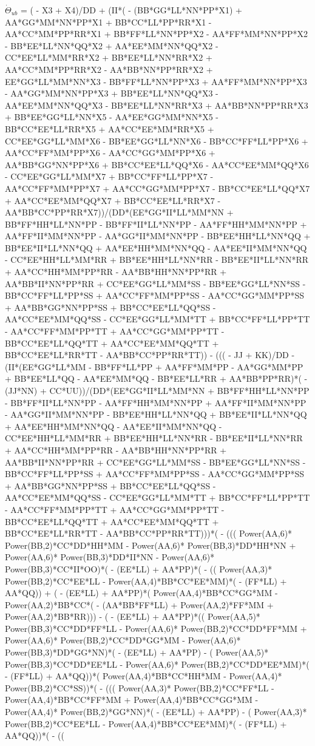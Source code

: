 \documentclass[10pt]{article} %
\begin{document}
$\dot{\Theta}_{ub}$ =
{\tiny
  ( - X3 + X4)/DD + (II*( - (BB*GG*LL*NN*PP*X1) + AA*GG*MM*NN*PP*X1 + BB*CC*LL*PP*RR*X1 - AA*CC*MM*PP*RR*X1 + BB*FF*LL*NN*PP*X2 - AA*FF*MM*NN*PP*X2 - BB*EE*LL*NN*QQ*X2 + AA*EE*MM*NN*QQ*X2 - CC*EE*LL*MM*RR*X2 + BB*EE*LL*NN*RR*X2 + AA*CC*MM*PP*RR*X2 - AA*BB*NN*PP*RR*X2 + EE*GG*LL*MM*NN*X3 - BB*FF*LL*NN*PP*X3 + AA*FF*MM*NN*PP*X3 - AA*GG*MM*NN*PP*X3 + BB*EE*LL*NN*QQ*X3 - AA*EE*MM*NN*QQ*X3 - BB*EE*LL*NN*RR*X3 + AA*BB*NN*PP*RR*X3 + BB*EE*GG*LL*NN*X5 - AA*EE*GG*MM*NN*X5 - BB*CC*EE*LL*RR*X5 + AA*CC*EE*MM*RR*X5 + CC*EE*GG*LL*MM*X6 - BB*EE*GG*LL*NN*X6 - BB*CC*FF*LL*PP*X6 + AA*CC*FF*MM*PP*X6 - AA*CC*GG*MM*PP*X6 + AA*BB*GG*NN*PP*X6 + BB*CC*EE*LL*QQ*X6 - AA*CC*EE*MM*QQ*X6 - CC*EE*GG*LL*MM*X7 + BB*CC*FF*LL*PP*X7 - AA*CC*FF*MM*PP*X7 + AA*CC*GG*MM*PP*X7 - BB*CC*EE*LL*QQ*X7 + AA*CC*EE*MM*QQ*X7 + BB*CC*EE*LL*RR*X7 - AA*BB*CC*PP*RR*X7))/(DD*(EE*GG*II*LL*MM*NN + BB*FF*HH*LL*NN*PP - BB*FF*II*LL*NN*PP - AA*FF*HH*MM*NN*PP + AA*FF*II*MM*NN*PP - AA*GG*II*MM*NN*PP - BB*EE*HH*LL*NN*QQ + BB*EE*II*LL*NN*QQ + AA*EE*HH*MM*NN*QQ - AA*EE*II*MM*NN*QQ - CC*EE*HH*LL*MM*RR + BB*EE*HH*LL*NN*RR - BB*EE*II*LL*NN*RR + AA*CC*HH*MM*PP*RR - AA*BB*HH*NN*PP*RR + AA*BB*II*NN*PP*RR + CC*EE*GG*LL*MM*SS - BB*EE*GG*LL*NN*SS - BB*CC*FF*LL*PP*SS + AA*CC*FF*MM*PP*SS - AA*CC*GG*MM*PP*SS + AA*BB*GG*NN*PP*SS + BB*CC*EE*LL*QQ*SS - AA*CC*EE*MM*QQ*SS - CC*EE*GG*LL*MM*TT + BB*CC*FF*LL*PP*TT - AA*CC*FF*MM*PP*TT + AA*CC*GG*MM*PP*TT - BB*CC*EE*LL*QQ*TT + AA*CC*EE*MM*QQ*TT + BB*CC*EE*LL*RR*TT - AA*BB*CC*PP*RR*TT)) - ((( - JJ + KK)/DD - (II*(EE*GG*LL*MM - BB*FF*LL*PP + AA*FF*MM*PP - AA*GG*MM*PP + BB*EE*LL*QQ - AA*EE*MM*QQ - BB*EE*LL*RR + AA*BB*PP*RR)*( - (JJ*NN) + CC*UU))/(DD*(EE*GG*II*LL*MM*NN + BB*FF*HH*LL*NN*PP - BB*FF*II*LL*NN*PP - AA*FF*HH*MM*NN*PP + AA*FF*II*MM*NN*PP - AA*GG*II*MM*NN*PP - BB*EE*HH*LL*NN*QQ + BB*EE*II*LL*NN*QQ + AA*EE*HH*MM*NN*QQ - AA*EE*II*MM*NN*QQ - CC*EE*HH*LL*MM*RR + BB*EE*HH*LL*NN*RR - BB*EE*II*LL*NN*RR + AA*CC*HH*MM*PP*RR - AA*BB*HH*NN*PP*RR + AA*BB*II*NN*PP*RR + CC*EE*GG*LL*MM*SS - BB*EE*GG*LL*NN*SS - BB*CC*FF*LL*PP*SS + AA*CC*FF*MM*PP*SS - AA*CC*GG*MM*PP*SS + AA*BB*GG*NN*PP*SS + BB*CC*EE*LL*QQ*SS - AA*CC*EE*MM*QQ*SS - CC*EE*GG*LL*MM*TT + BB*CC*FF*LL*PP*TT - AA*CC*FF*MM*PP*TT + AA*CC*GG*MM*PP*TT - BB*CC*EE*LL*QQ*TT + AA*CC*EE*MM*QQ*TT + BB*CC*EE*LL*RR*TT - AA*BB*CC*PP*RR*TT)))*( - ((( Power(AA,6)* Power(BB,2)*CC*DD*HH*MM -  Power(AA,6)* Power(BB,3)*DD*HH*NN +  Power(AA,6)* Power(BB,3)*DD*II*NN -  Power(AA,6)* Power(BB,3)*CC*II*OO)*( - (EE*LL) + AA*PP)*( - (( Power(AA,3)* Power(BB,2)*CC*EE*LL -  Power(AA,4)*BB*CC*EE*MM)*( - (FF*LL) + AA*QQ)) + ( - (EE*LL) + AA*PP)*( Power(AA,4)*BB*CC*GG*MM -  Power(AA,2)*BB*CC*( - (AA*BB*FF*LL) +  Power(AA,2)*FF*MM +  Power(AA,2)*BB*RR))) - ( - (EE*LL) + AA*PP)*(( Power(AA,5)* Power(BB,3)*CC*DD*FF*LL -  Power(AA,6)* Power(BB,2)*CC*DD*FF*MM +  Power(AA,6)* Power(BB,2)*CC*DD*GG*MM -  Power(AA,6)* Power(BB,3)*DD*GG*NN)*( - (EE*LL) + AA*PP) - ( Power(AA,5)* Power(BB,3)*CC*DD*EE*LL -  Power(AA,6)* Power(BB,2)*CC*DD*EE*MM)*( - (FF*LL) + AA*QQ))*( Power(AA,4)*BB*CC*HH*MM -  Power(AA,4)* Power(BB,2)*CC*SS))*( - ((( Power(AA,3)* Power(BB,2)*CC*FF*LL -  Power(AA,4)*BB*CC*FF*MM +  Power(AA,4)*BB*CC*GG*MM -  Power(AA,4)* Power(BB,2)*GG*NN)*( - (EE*LL) + AA*PP) - ( Power(AA,3)* Power(BB,2)*CC*EE*LL -  Power(AA,4)*BB*CC*EE*MM)*( - (FF*LL) + AA*QQ))*( - (( }
\end{document}

